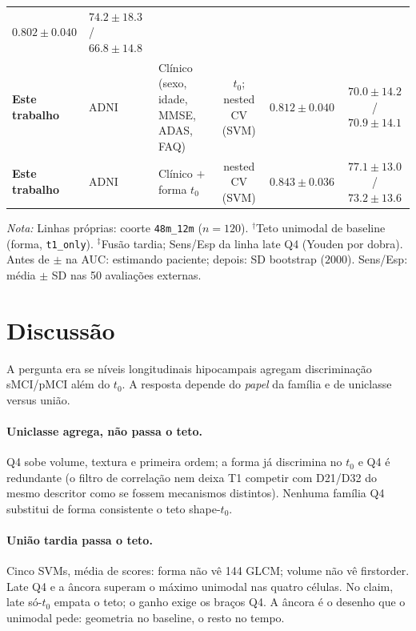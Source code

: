 \documentclass[review]{elsarticle}
\newcommand{\code}[1]{\texttt{#1}}
\begin{document}
\begin{table}
\begin{tabular}{@{}lllccc@{}}
$\mathbf{0.802 \pm 0.040}$ & $\mathbf{74.2 \pm 18.3}$ / $\mathbf{66.8 \pm 14.8}$ \\
\textbf{Este trabalho} & ADNI &
Clínico (sexo, idade, MMSE, ADAS, FAQ) &
$t_0$; nested CV (SVM) &
$\mathbf{0.812 \pm 0.040}$ & $\mathbf{70.0 \pm 14.2}$ / $\mathbf{70.9 \pm 14.1}$ \\
\textbf{Este trabalho} & ADNI &
Clínico $+$ forma $t_0$ &
nested CV (SVM) &
$\mathbf{0.843 \pm 0.036}$ & $\mathbf{77.1 \pm 13.0}$ / $\mathbf{73.2 \pm 13.6}$ \\
\bottomrule
\end{tabular}
\vspace{0.5em}
\begin{flushleft}
\scriptsize
\textit{Nota:}
Linhas próprias: coorte \code{48m\_12m} ($n=120$).
$^{\dagger}$Teto unimodal de baseline (forma, \code{t1\_only}).
$^{\ddagger}$Fusão tardia; Sens/Esp da linha late Q4 (Youden por dobra).
Antes de $\pm$ na AUC: estimando paciente; depois: SD bootstrap ($2000$).
Sens/Esp: média $\pm$ SD nas 50 avaliações externas.
\end{flushleft}
\end{table}

\section{Discussão}\label{sec:Discussions}

A pergunta era se níveis longitudinais hipocampais agregam discriminação sMCI/pMCI além do $t_0$.
A resposta depende do \emph{papel} da família e de uniclasse versus união.

\paragraph{Uniclasse agrega, não passa o teto.}
Q4 sobe volume, textura e primeira ordem; a forma já discrimina no $t_0$ e Q4 é redundante (o filtro de correlação nem deixa T1 competir com D21/D32 do mesmo descritor como se fossem mecanismos distintos).
Nenhuma família Q4 substitui de forma consistente o teto shape-$t_0$.

\paragraph{União tardia passa o teto.}
Cinco SVMs, média de scores: forma não vê 144 GLCM; volume não vê firstorder.
Late Q4 e a âncora superam o máximo unimodal nas quatro células.
No claim, late só-$t_0$ empata o teto; o ganho exige os braços Q4.
A âncora é o desenho que o unimodal pede: geometria no baseline, o resto no tempo.
\end{document}

